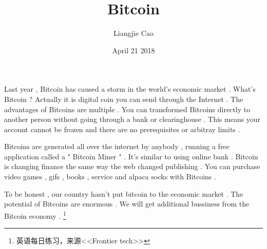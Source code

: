 \documentclass[50pt]{article}
\begin{document}
\title{Bitcoin}
\author{Liangjie Cao}
\date{April 21 2018}
\maketitle
\par
Last year , Bitcoin has caused a storm in the world's economic market . What's Bitcoin ? Actually it is digital coin you can send through the Internet . The advantages of Bitcoins are multiple . You can transformed Bitcoins directly to another person without going through a bank or clearinghouse . This means your account cannot be frozen and there are no prerequisites or arbitray limits . \\
\par
Bitcoins are generated all over the internet by anybody , running a free application called a " Bitcoin Miner " . It's similar to using online bank . Bitcoin is changing finance the same way the web changed publishing . You can purchase video games , gifs , books , service and alpaca socks with Bitcoins . \\
\par
To be honest , our country hasn't put bitcoin to the economic market . The potential of Bitcoins are enormous . We will get additional bussiness from the Bitcoin economy . 
\footnote{\centering 英语每日练习，来源<<Frontier tech>>}
\end{document}
